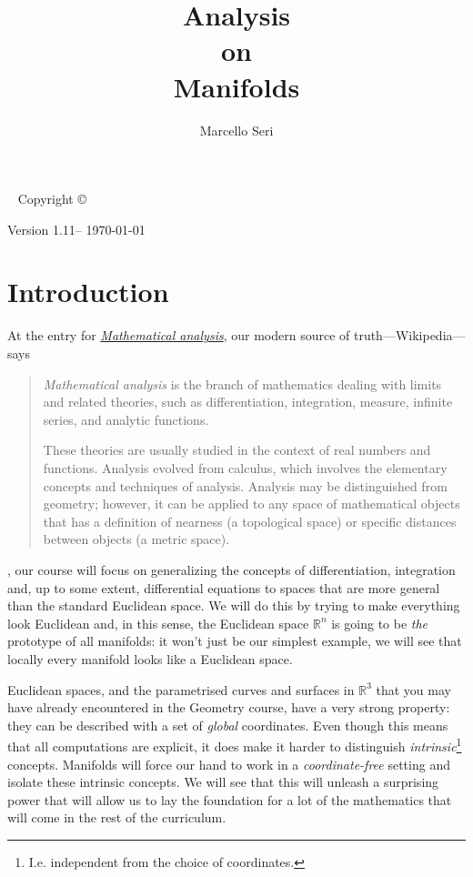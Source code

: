 \documentclass[nobib, a4paper]{tufte-book}
\title{Analysis\\ \noindent
  on\\ \noindent
  Manifolds
}
\author{Marcello Seri}
\newcommand{\docversion}{1.11}
\theoremstyle{plain}
\theoremstyle{definition}
\theoremstyle{remark}
\newcommand{\R}{\mathbb{R}}
\begin{document}
\maketitlepage

\newpage

\begin{fullwidth}
	~\vfill
	\thispagestyle{empty}
	\setlength{\parindent}{0pt}
	\setlength{\parskip}{\baselineskip}
	Copyright \copyright\ \the\year\ \thanklessauthor

	\par Version \docversion -- \today

	\vfill
	\small{\doclicenseThis}
\end{fullwidth}

\tableofcontents
\cleardoublepage

\chapter*{Introduction}

At the entry for \href{https://en.wikipedia.org/wiki/Mathematical_analysis}{\emph{Mathematical analysis}}, our modern source of truth---Wikipedia---says
\medskip

\begin{quotation}
	\emph{Mathematical analysis} is the branch of mathematics dealing with limits and related theories, such as differentiation, integration, measure, infinite series, and analytic functions.

	These theories are usually studied in the context of real numbers and functions. Analysis evolved from calculus, which involves the elementary concepts and techniques of analysis. Analysis may be distinguished from geometry; however, it can be applied to any space of mathematical objects that has a definition of nearness (a topological space) or specific distances between objects (a metric space).
\end{quotation}

, our course will focus on generalizing the concepts of differentiation, integration and, up to some extent, differential equations to spaces that are more general than the standard Euclidean space.
We will do this by trying to make everything look Euclidean and, in this sense, the Euclidean space $\R^n$ is going to be \emph{the} prototype of all manifolds: it won't just be our simplest example, we will see that locally every manifold looks like a Euclidean space.

Euclidean spaces, and the parametrised curves and surfaces in $\R^3$ that you may have already encountered in the Geometry course, have a very strong property: they can be described with a set of \emph{global} coordinates.
Even though this means that all computations are explicit, it does make it harder to distinguish \emph{intrinsic}\footnote{I.e. independent from the choice of coordinates.} concepts.
Manifolds will force our hand to work in a \emph{coordinate-free} setting and isolate these intrinsic concepts.
We will see that this will unleash a surprising power that will allow us to lay the foundation for a lot of the mathematics that will come in the rest of the curriculum.
\medskip
\end{document}
